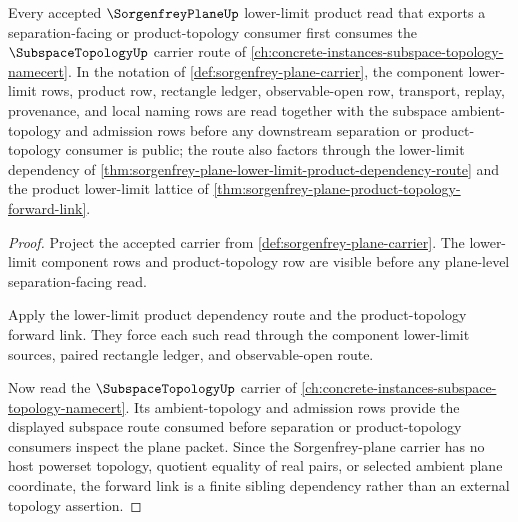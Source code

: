 \begin{theorem}
\label{thm:sorgenfrey-plane-subspace-topology-forward-link}
Every accepted $\SorgenfreyPlaneUp$ lower-limit product read that exports a separation-facing or product-topology consumer first consumes the $\SubspaceTopologyUp$ carrier route of \autoref{ch:concrete-instances-subspace-topology-namecert}. In the notation of \autoref{def:sorgenfrey-plane-carrier}, the component lower-limit rows, product row, rectangle ledger, observable-open row, transport, replay, provenance, and local naming rows are read together with the subspace ambient-topology and admission rows before any downstream separation or product-topology consumer is public; the route also factors through the lower-limit dependency of \autoref{thm:sorgenfrey-plane-lower-limit-product-dependency-route} and the product lower-limit lattice of \autoref{thm:sorgenfrey-plane-product-topology-forward-link}.
\end{theorem}
\begin{proof}
Project the accepted carrier from \autoref{def:sorgenfrey-plane-carrier}. The lower-limit component rows and product-topology row are visible before any plane-level separation-facing read.

Apply the lower-limit product dependency route and the product-topology forward link. They force each such read through the component lower-limit sources, paired rectangle ledger, and observable-open route.

Now read the $\SubspaceTopologyUp$ carrier of \autoref{ch:concrete-instances-subspace-topology-namecert}. Its ambient-topology and admission rows provide the displayed subspace route consumed before separation or product-topology consumers inspect the plane packet. Since the Sorgenfrey-plane carrier has no host powerset topology, quotient equality of real pairs, or selected ambient plane coordinate, the forward link is a finite sibling dependency rather than an external topology assertion.
\end{proof}
